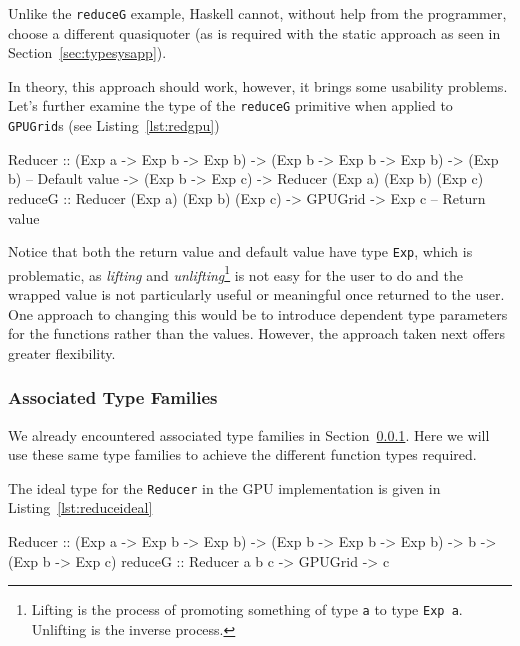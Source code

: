 \documentclass[12pt,a4paper,oneside]{scrbook}
\begin{document}
Unlike the \texttt{reduceG} example, Haskell cannot, without help from the
programmer, choose a different quasiquoter (as is required with the static
approach as seen in Section~\ref{sec:typesysapp}).

In theory, this approach should work, however, it brings some usability
problems. Let's further examine the type of the \texttt{reduceG} primitive
when applied to \texttt{GPUGrid}s (see Listing~\ref{lst:redgpu})

\begin{hflisting}[label={lst:redgpu}, caption={The type of the reducer once the
    Accelerate types are applied.}]
Reducer :: (Exp a -> Exp b -> Exp b)
        -> (Exp b -> Exp b -> Exp b)
        -> (Exp b) -- Default value
        -> (Exp b -> Exp c)
        -> Reducer (Exp a) (Exp b) (Exp c)
reduceG :: Reducer (Exp a) (Exp b) (Exp c)
        -> GPUGrid
        -> Exp c -- Return value
\end{hflisting}

Notice that both the return value and default value have type \texttt{Exp},
which is problematic, as \emph{lifting} and \emph{unlifting}\footnote{Lifting is
  the process of promoting something of type \texttt{a} to type \texttt{Exp
    a}. Unlifting is the inverse process.}  is not easy for the user to do and
the wrapped value is not particularly useful or meaningful once returned to the
user. One approach to changing this would be to introduce dependent type
parameters for the functions rather than the values. However, the approach taken
next offers greater flexibility.

\subsubsection{Associated Type Families}
\label{sec:typefam}

We already encountered associated type families in
Section~\ref{sec:typefam}. Here we will use these same type families to achieve
the different function types required.

The ideal type for the \texttt{Reducer} in the GPU implementation is given in
Listing~\ref{lst:reduceideal}

\begin{hflisting}[label={lst:reduceideal}, caption={The optimal type for the
    reduce primitive under Accelerate.}]
Reducer :: (Exp a -> Exp b -> Exp b)
        -> (Exp b -> Exp b -> Exp b)
        -> b
        -> (Exp b -> Exp c)
reduceG :: Reducer a b c -> GPUGrid -> c
\end{hflisting}
\end{document}
